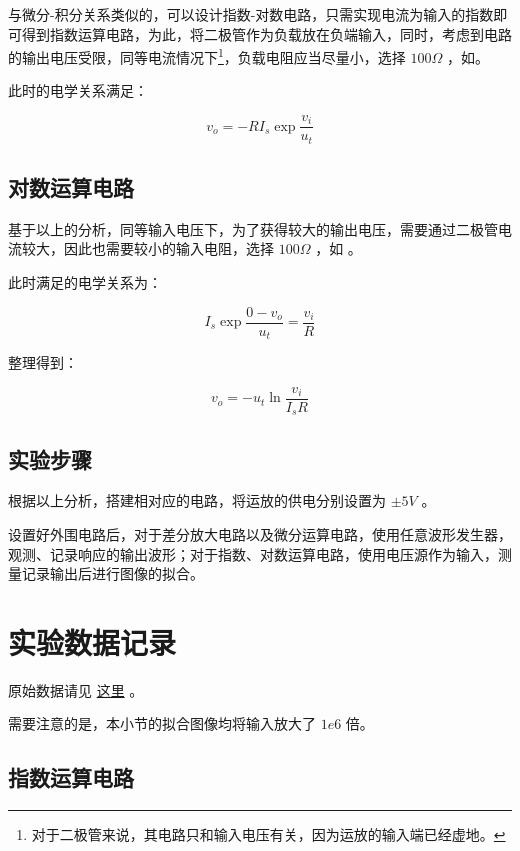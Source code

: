 \documentclass[lang=cn,11pt,a4paper,cite=authoryear]{elegantpaper}
\begin{document}
与微分-积分关系类似的，可以设计指数-对数电路，只需实现电流为输入的指数即可得到指数运算电路，为此，将二极管作为负载放在负端输入，同时，考虑到电路的输出电压受限，同等电流情况下\footnote{对于二极管来说，其电路只和输入电压有关，因为运放的输入端已经虚地。}，负载电阻应当尽量小，选择 \(100 \Omega\) ，如。


此时的电学关系满足：

\[v_o = - R I_s \exp \frac{v_i}{u_t} \]

\subsection{对数运算电路}

基于以上的分析，同等输入电压下，为了获得较大的输出电压，需要通过二极管电流较大，因此也需要较小的输入电阻，选择 \(100 \Omega\) ，如 。


此时满足的电学关系为：

\[I_s \exp \frac{0 - v_o}{u_t} = \frac{v_i}{R} \]

整理得到：

\[v_o = - u_t \ln \frac{v_i}{I_s R}\]

\subsection{实验步骤}

根据以上分析，搭建相对应的电路，将运放的供电分别设置为 \(\pm 5 V\) 。

设置好外围电路后，对于差分放大电路以及微分运算电路，使用任意波形发生器，观测、记录响应的输出波形；对于指数、对数运算电路，使用电压源作为输入，测量记录输出后进行图像的拟合。

\section{实验数据记录}

原始数据请见 \href{https://github.com/PannenetsF/Mirco-Electronic-Device-Experiment/tree/main/homework/hw15}{这里} 。

需要注意的是，本小节的拟合图像均将输入放大了 \(1e6\) 倍。

\subsection{指数运算电路}
\end{document}
